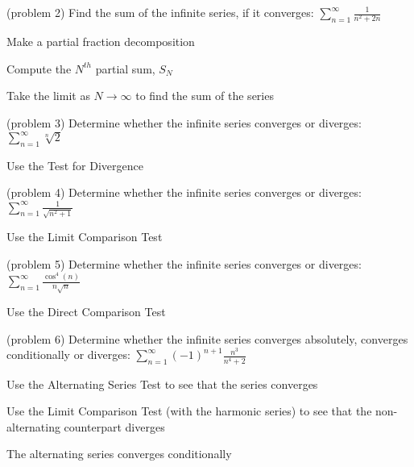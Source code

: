 \documentclass[handout]{ximera}
\begin{document}
\begin{problem}(problem 2)
Find the sum of the infinite series, if it converges: $\displaystyle \sum_{n=1}^\infty \frac{1}{n^2 + 2n}$
\begin{hint}
Make a partial fraction decomposition
\end{hint}

\begin{hint}
Compute the $N^{th}$ partial sum, $S_N$
\end{hint}

\begin{hint}
Take the limit as $N \to \infty$ to find the sum of the series
\end{hint}

\end{problem}


\begin{problem}(problem 3)
Determine whether the infinite series converges or diverges: $\displaystyle \sum_{n=1}^\infty \sqrt[n] 2$

\begin{hint}
Use the Test for Divergence
\end{hint}

\end{problem}


\begin{problem}(problem 4)
Determine whether the infinite series converges or diverges: $\displaystyle \sum_{n=1}^\infty \frac{1}{\sqrt{n^2 + 1}}$

\begin{hint}
Use the Limit Comparison Test
\end{hint}

\end{problem}

\begin{problem}(problem 5)
Determine whether the infinite series converges or diverges: $\displaystyle \sum_{n=1}^\infty \frac{\cos^4(n)}{n\sqrt{n}}$

\begin{hint}
Use the Direct Comparison Test
\end{hint}

\end{problem}

\begin{problem}(problem 6)
Determine whether the infinite series converges absolutely, converges conditionally or diverges: $\displaystyle \sum_{n=1}^\infty (-1)^{n+1} \frac{n^3}{n^4 + 2}$

\begin{hint}
Use the Alternating Series Test to see that the series converges
\end{hint}

\begin{hint}
Use the Limit Comparison Test (with the harmonic series) to see that the 
non-alternating counterpart diverges
\end{hint}

\begin{hint}
The alternating series converges conditionally
\end{hint}

\end{problem}
\end{document}

